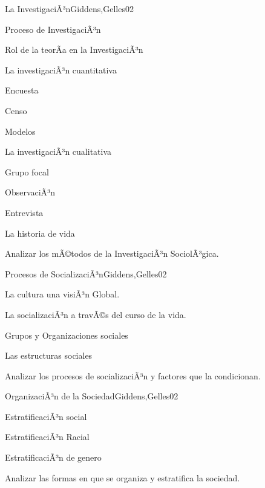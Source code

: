 \begin{syllabus}
\begin{unit}{La InvestigaciÃ³n}{Giddens,Gelles}{0}{2}
    \begin{topics}
      \item Proceso de InvestigaciÃ³n
      \item Rol de la teorÃ­a en la InvestigaciÃ³n
      \item La investigaciÃ³n cuantitativa
      \item Encuesta
      \item Censo
      \item Modelos
      \item La investigaciÃ³n cualitativa
      \item Grupo focal
      \item ObservaciÃ³n
      \item Entrevista
      \item La historia de vida
    \end{topics}
    \begin{unitgoals}
      \item Analizar los mÃ©todos de la InvestigaciÃ³n SociolÃ³gica.
    \end{unitgoals}
\end{unit}

\begin{unit}{Procesos de SocializaciÃ³n}{Giddens,Gelles}{0}{2}
    \begin{topics}
      \item La cultura una visiÃ³n Global.
      \item La socializaciÃ³n a travÃ©s del curso de la vida.
      \item Grupos y Organizaciones sociales
      \item Las estructuras sociales
    \end{topics}
    \begin{unitgoals}
      \item Analizar los procesos de socializaciÃ³n y factores que la condicionan.
    \end{unitgoals}
\end{unit}

\begin{unit}{OrganizaciÃ³n de la Sociedad}{Giddens,Gelles}{0}{2}
    \begin{topics}
      \item EstratificaciÃ³n social
      \item EstratificaciÃ³n Racial
      \item EstratificaciÃ³n de genero
    \end{topics}
    \begin{unitgoals}
      \item Analizar las formas en que se organiza y estratifica la sociedad.
    \end{unitgoals}
\end{unit}


\end{syllabus}
